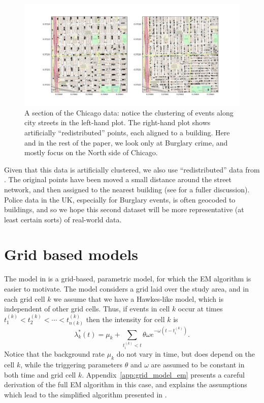 \documentclass[twoside,a4paper]{article}
\theoremstyle{plain}
\theoremstyle{definition}
\begin{document}
\begin{figure}
  \includegraphics[width=\textwidth]{../notebooks/Chicago_overview.png}
  \caption{A section of the Chicago data: notice the clustering of events along city
  streets in the left-hand plot.  The right-hand plot shows artificially ``redistributed''
  points, each aligned to a building.  Here and in the rest of the paper, we look only at
  Burglary crime, and mostly focus on the North side of Chicago.}
  \label{fig:chicago_overview}
\end{figure}

Given that this data is artificially clustered, we also use ``redistributed'' data from
\cite{daws1}. The original points have been moved a small distance around the street network,
and then assigned to the nearest building (see \cite{daws1} for a fuller discussion).
Police data in the UK, especially for Burglary events, is often geocoded to buildings, and so
we hope this second dataset will be more representative (at least certain sorts) of real-world
data.



\section{Grid based models}\label{sec:gbm}

The model in \cite{sepp2} is a grid-based, parametric model, for which the EM
algorithm is easier to motivate.  The model considers a grid laid over the study area,
and in each grid cell $k$ we assume that we have a Hawkes-like model, which is independent
of other grid cells.  Thus, if events in cell $k$ occur at times $t^{(k)}_1 < 
t^{(k)}_2 < \cdots < t^{(k)}_{n(k)}$ then the intensity for cell $k$ is
\[ \lambda^*_k(t) = \mu_k + \sum_{t^{(k)}_i < t} \theta \omega
e^{-\omega(t-t^{(k)}_i)}. \]
Notice that the background rate $\mu_k$ do not vary in time, but does depend on the cell $k$,
while the triggering parameters $\theta$ and $\omega$ are assumed to be constant in both time
and grid cell $k$.  Appendix~\ref{app:grid_model_em} presents a careful derivation of
the full EM algorithm in this case, and explains the assumptions which lead to the simplified
algorithm presented in \cite[Section~2.2]{sepp2}.
\end{document}
